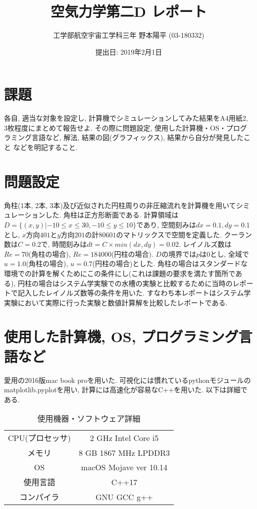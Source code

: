 \documentclass[12pt]{jsarticle}
\title{\Huge{空気力学第二D レポート}}
\author{\LARGE{工学部航空宇宙工学科三年 野本陽平 (03-180332)}}
\date{\large{提出日: 2019年2月1日}}
\begin{document}
\maketitle
\section*{課題}
各自, 適当な対象を設定し, 計算機でシミュレーションしてみた結果をA4用紙2, 3枚程度にまとめて報告せよ. その際に問題設定, 使用した計算機・OS・プログラミング言語など, 解法, 結果の図(グラフィックス), 結果から自分が発見したこと などを明記すること.
\section{問題設定}
角柱(1本, 2本, 3本)及び近似された円柱周りの非圧縮流れを計算機を用いてシミュレーションした. 角柱は正方形断面である. 計算領域は$D=\{(x,y)|-10\le x\le 30, -10\le y\le 10\}$であり, 空間刻みは$dx=0.1, dy=0.1$とし, $x$方向$401$と$y$方向$201$の計$80601$のマトリックスで空間を定義した. クーラン数は$C=0.2$で, 時間刻みは$dt=C\times min(dx, dy)=0.02$. レイノルズ数は$Re=70$(角柱の場合), $Re=184000$(円柱の場合). $D$の境界では$p$は$0$とし, 全域で$u=1.0$(角柱の場合), $u=0.7$(円柱の場合)とした. 角柱の場合はスタンダードな環境での計算を解くためにこの条件にし(これは課題の要求を満たす箇所である), 円柱の場合はシステム学実験での水槽の実験と比較するために当時のレポートで記入したレイノルズ数等の条件を用いた. すなわち本レポートはシステム学実験において実際に行った実験と数値計算解を比較したレポートである.
\section{使用した計算機, OS, プログラミング言語など}
愛用の2016版mac book proを用いた. 可視化には慣れているpythonモジュールのmatplotlib.pyplotを用い, 計算には高速化が容易なC++を用いた. 以下は詳細である.
\begin{table}[htb]
  \begin{center}
    \begin{tabular}{|c|c|} \hline
      CPU(プロセッサ) & 2 GHz Intel Core i5 \\
      メモリ & 8 GB 1867 MHz LPDDR3 \\
      OS & macOS Mojave ver 10.14 \\
      使用言語 & C++17 \\
      コンパイラ & GNU GCC g++ \\  \hline
    \end{tabular}
  \end{center}
\caption{使用機器・ソフトウェア詳細}
\end{table}
\end{document}
